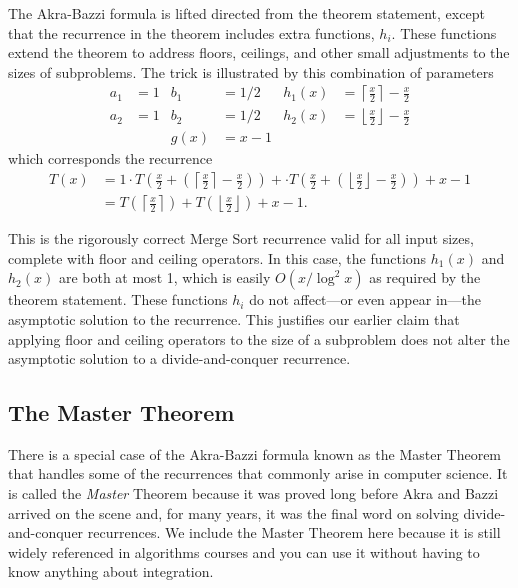 The Akra-Bazzi formula is lifted directed from the theorem statement,
except that the recurrence in the theorem includes extra functions,
$h_i$.  These functions extend the theorem to address floors,
ceilings, and other small adjustments to the sizes of subproblems.
The trick is illustrated by this combination of parameters
\begin{align*}
a_1 &= 1 & b_1 & = 1/2 & h_1(x) & = \left\lceil\frac{x}{2}\right\rceil -
\frac{x}{2}\\
a_2 &= 1 & b_2 & = 1/2 & h_2(x) & = \left\lfloor\frac{x}{2}\right\rfloor -
\frac{x}{2} \\
& & g(x) & = x - 1
\end{align*}
which corresponds the recurrence
\begin{align*}
T(x) & = 1 \cdot T\left(\frac{x}{2} + \left(\left\lceil\frac{x}{2}\right\rceil -\frac{x}{2}\right)\right) + 
 \cdot T\left(\frac{x}{2} +
\left(\left\lfloor\frac{x}{2}\right\rfloor -
  \frac{x}{2}\right)\right) + x - 1 \\
 & = T\left(\left\lceil\frac{x}{2}\right\rceil\right) +
 T\left(\left\lfloor\frac{x}{2}\right\rfloor\right) + x - 1.
\end{align*}

This is the rigorously correct Merge Sort recurrence valid for all
input sizes, complete with floor and ceiling operators.  In this case,
the functions $h_1(x)$ and $h_2(x)$ are both at most 1, which is
easily $O(x
/ \log^2 x)$ as required by the theorem statement.  These functions
$h_i$ do not affect---or even appear in---the asymptotic solution to
the recurrence.  This justifies our earlier claim that applying floor
and ceiling operators to the size of a subproblem does not alter the
asymptotic solution to a divide-and-conquer recurrence.

\subsection{The Master Theorem}

There is a special case of the Akra-Bazzi formula known as the Master
Theorem that handles some of the recurrences that commonly arise in
computer science.  It is called the \emph{Master} Theorem because it
was proved long before Akra and Bazzi arrived on the scene and, for
many years, it was the final word on solving divide-and-conquer
recurrences.  We include the Master Theorem here because it is still
widely referenced in algorithms courses and you can use it without
having to know anything about integration.

